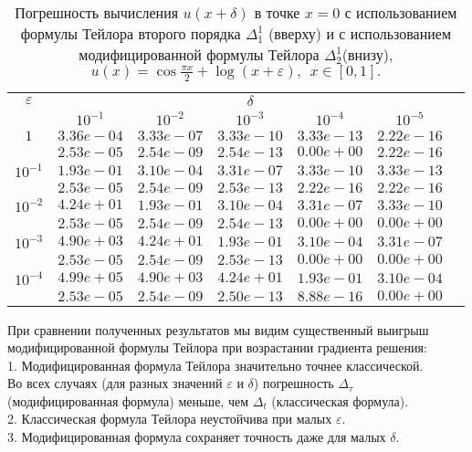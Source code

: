 \documentclass[10pt,twoside]{uz_kgu}
\begin{document}
\begin{table} [!htb]
		\caption {Погрешность вычисления $u(x+ \delta)$ в точке $x=0$ с использованием формулы Тейлора второго порядка $\Delta_1^1$ (вверху) и с использованием модифицированной формулы Тейлора $\Delta_2^1$(внизу),
		$u(x)=  \cos \frac{\pi x}{2} + \log{(x+\varepsilon)} ,\ \    x\in [0,1].$}
	\begin{center}
		\begin{tabular}{|c|c|c|c|c|c|c}
			\cline{1-6} $\varepsilon$ & \multicolumn{5}{c|}{$\delta$} \\
			\cline{2-6} &$10^{-1}$ & $10^{-2}$ & $10^{-3}$  & $10^{-4}$& $10^{-5}$\\
			\cline{1-6}
			$1$
			&$3.36e-04$&$3.33e-07$&$3.33e-10$&$3.33e-13$& $2.22e-16$\\
			&$2.53e-05$&$2.54e-09$&$2.54e-13$&$0.00e+00$& $2.22e-16$\\
			\cline{1-6}
			$10^{-1}$
			&$1.93e-01$&$3.10e-04$&$3.31e-07$&$3.33e-10$&$3.33e-13$\\
			&$2.53e-05$&$2.54e-09$&$2.53e-13$&$2.22e-16$&$2.22e-16$\\
			\cline{1-6}
			$10^{-2}$
			&$4.24e+01$&$1.93e-01$&$3.10e-04$&$3.31e-07$&$3.33e-10$\\
			&$2.53e-05$&$2.54e-09$&$2.54e-13$&$0.00e+00$&$0.00e+00$\\
			\cline{1-6}
			$10^{-3}$
			&$4.90e+03$&$4.24e+01$&$1.93e-01$&$3.10e-04$&$3.31e-07$\\
			&$2.53e-05$&$2.54e-09$&$2.53e-13$&$0.00e+00$&$0.00e+00$\\
			\cline{1-6}
			$10^{-4}$
			&$4.99e+05$&$4.90e+03$&$4.24e+01$&$1.93e-01$&$3.10e-04$\\
			&$2.53e-05$&$2.54e-09$&$2.50e-13$&$8.88e-16$&$0.00e+00$\\
			\cline{1-6}
		\end{tabular}
	\end{center}
\end{table}


При сравнении полученных результатов мы видим существенный выигрыш модифицированной формулы Тейлора при возрастании градиента решения:\\
1. Модифицированная формула Тейлора значительно точнее классической.\\
Во всех случаях (для разных значений $\varepsilon$ и $\delta$) погрешность $\Delta_\tau$ (модифицированная формула) меньше,  чем $\Delta_t$ (классическая формула).\\
2. Классическая формула Тейлора неустойчива при малых $\varepsilon.$\\
3. Модифицированная формула сохраняет точность даже для малых $\delta$.\\
\end{document}
